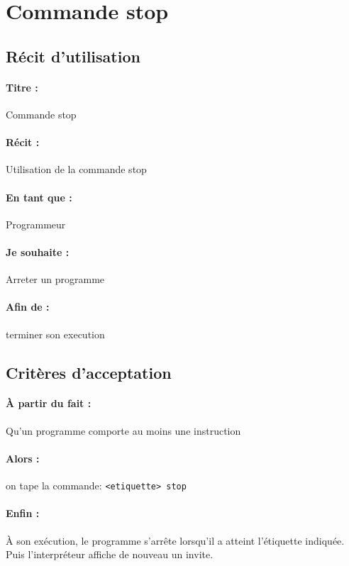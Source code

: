  \section{Commande stop}
    \subsection*{Récit d'utilisation}

    \paragraph{Titre : } Commande stop
    \paragraph{Récit : } Utilisation de la commande stop
    \paragraph{En tant que : } Programmeur
    \paragraph{Je souhaite : } Arreter un programme
    \paragraph{Afin de : } terminer son execution

    \subsection*{Critères d'acceptation}

    \paragraph{À partir du fait : } Qu'un programme comporte au moins une instruction
    \paragraph{Alors : } on tape la commande: \verb|<etiquette> stop|
    \paragraph{Enfin : } À son exécution, le programme s'arrête lorsqu'il a atteint
                         l'étiquette indiquée.
			             Puis l'interpréteur affiche de nouveau un invite.